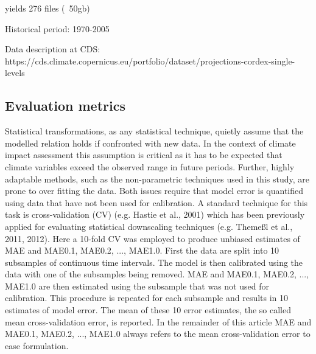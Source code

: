 





yields 276 files (~50gb)

Historical period: 1970-2005

Data description at CDS:
https://cds.climate.copernicus.eu/portfolio/dataset/projections-cordex-single-levels


\subsection{Evaluation metrics}

Statistical transformations, as any statistical technique,
quietly assume that the modelled relation holds if confronted
with new data. In the context of climate impact assessment
this assumption is critical as it has to be expected that climate variables exceed the observed range in future periods.
Further, highly adaptable methods, such as the non-parametric techniques used in this study, are prone to over fitting the
data. Both issues require that model error is quantified using
data that have not been used for calibration. A standard technique for this task is cross-validation (CV) (e.g. Hastie et al.,
2001) which has been previously applied for evaluating statistical downscaling techniques (e.g. Themeßl et al., 2011,
2012). Here a 10-fold CV was employed to produce unbiased estimates of MAE and MAE0.1, MAE0.2, ..., MAE1.0.
First the data are split into 10 subsamples of continuous time
intervals. The model is then calibrated using the data with
one of the subsamples being removed. MAE and MAE0.1,
MAE0.2, ..., MAE1.0 are then estimated using the subsample
that was not used for calibration. This procedure is repeated
for each subsample and results in 10 estimates of model error. The mean of these 10 error estimates, the so called mean
cross-validation error, is reported. In the remainder of this article MAE and MAE0.1, MAE0.2, ..., MAE1.0 always refers
to the mean cross-validation error to ease formulation.

